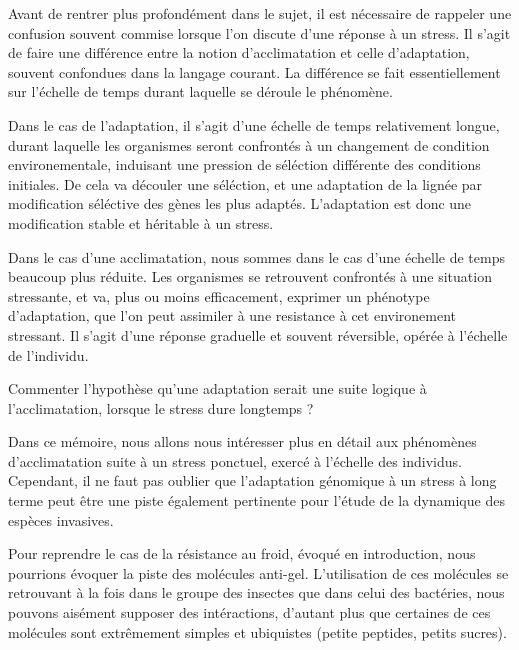 Avant de rentrer plus profondément dans le sujet, il est nécessaire de
rappeler une confusion souvent commise lorsque l'on discute d'une réponse à un
stress. Il s'agit de faire une différence entre la notion d'acclimatation et
celle d'adaptation, souvent confondues dans la langage courant. La différence
se fait essentiellement sur l'échelle de temps durant laquelle se déroule le
phénomène.

Dans le cas de l'adaptation, il s'agit d'une échelle de temps relativement
longue, durant laquelle les organismes seront confrontés à un changement de
condition environementale, induisant une pression de séléction différente des
conditions initiales. De cela va découler une séléction, et une adaptation de
la lignée par modification séléctive des gènes les plus adaptés. L'adaptation
est donc une modification stable et héritable à un stress.

Dans le cas d'une acclimatation, nous sommes dans le cas d'une échelle de
temps beaucoup plus réduite. Les organismes se retrouvent confrontés à une
situation stressante, et va, plus ou moins efficacement, exprimer un phénotype
d'adaptation, que l'on peut assimiler à une resistance à cet environement
stressant. Il s'agit d'une réponse graduelle et souvent réversible, opérée à
l'échelle de l'individu.

\begin{note}
	Commenter l'hypothèse qu'une adaptation serait une suite logique à l'acclimatation, lorsque le stress dure longtemps ?
\end{note}


Dans ce mémoire, nous allons nous intéresser plus en détail aux phénomènes
d'acclimatation suite à un stress ponctuel, exercé à l'échelle des individus.
Cependant, il ne faut pas oublier que l'adaptation génomique à un stress à
long terme peut être une piste également pertinente pour l'étude de la
dynamique des espèces invasives.

Pour reprendre le cas de la résistance au froid, évoqué en introduction, nous
pourrions évoquer la piste des molécules anti-gel. L'utilisation de ces
molécules se retrouvant à la fois dans le groupe des insectes\cite{duman2001}
que dans celui des bactéries\cite{xu1998}, nous pouvons aisément supposer des
intéractions, d'autant plus que certaines de ces molécules sont extrêmement
simples et ubiquistes (petite peptides, petits sucres).
